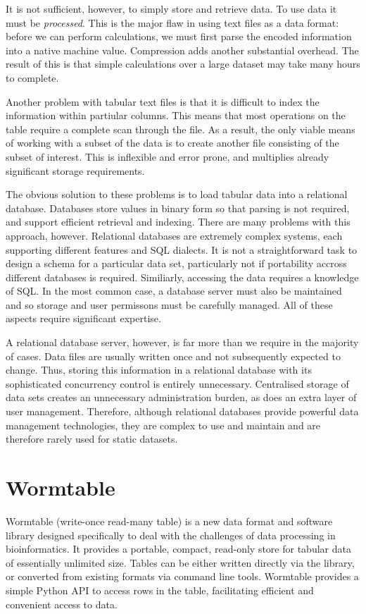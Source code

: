 \documentclass{bioinfo}
\begin{document}
It is not sufficient, however, to simply store and retrieve data. To use data
it must be \emph{processed}. This is the major flaw in 
using text files as a data format: before we can perform calculations, we 
must first parse the encoded information into a native 
machine value. Compression adds another substantial overhead. The result 
of this is that simple calculations over a large dataset may take 
many hours to complete.

Another problem with tabular text files is that it is difficult 
to index the information within partiular columns. 
This means that most operations on the table require a complete scan 
through the file. As a result, the only viable means of 
working with a subset of the data
is to create another file consisting of the subset of interest. 
This is inflexible and error prone, and multiplies already significant  
storage requirements.

The obvious solution to these problems is to load tabular data into a
relational database. Databases store values in binary form so that parsing is 
not required, and support efficient retrieval and indexing. There 
are many problems with this approach, however. Relational databases are 
extremely complex systems, each supporting different features and SQL 
dialects. It is not a straightforward task to design a schema for a 
particular data set, particularly not if portability accross different 
databases is required. Similiarly, accessing the data requires a knowledge
of SQL. In the most common case, a database server must also be maintained
and so storage and user permissons must be carefully managed. All of 
these aspects require significant expertise.

A relational database server, however, is far more than we require in the 
majority of cases. Data files are usually written once and 
not subsequently expected to change.
Thus, storing this information 
in a relational database with its sophisticated concurrency control
is entirely unnecessary. Centralised storage of data sets
creates an unnecessary administration burden, as does an extra
layer of user management. Therefore, although relational databases
provide powerful data management technologies, they are complex
to use and maintain and are therefore rarely used for 
static datasets.

\section{Wormtable}
Wormtable (write-once read-many table) 
is a new data format and software library designed specifically
to deal with the challenges of data processing in bioinformatics.
It provides a portable, compact, read-only store for tabular
data of essentially unlimited size. Tables can
be either written directly via the library, or converted
from existing formats via command line tools. 
Wormtable provides a simple Python API to access rows
in the table, facilitating efficient and convenient access to 
data.
\end{document}
